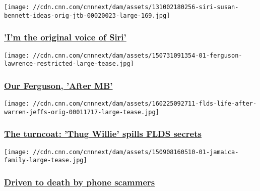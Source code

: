 \href{/2013/10/04/tech/mobile/bennett-siri-iphone-voice/index.html}{}

\texttt{[image: //cdn.cnn.com/cnnnext/dam/assets/131002180256-siri-susan-bennett-ideas-orig-jtb-00020023-large-169.jpg]}

\hypertarget{im-the-original-voice-of-siri}{%
\subsubsection{\texorpdfstring{\href{/2013/10/04/tech/mobile/bennett-siri-iphone-voice/index.html}{'I'm
the original voice of
Siri'}}{'I'm the original voice of Siri'}}\label{im-the-original-voice-of-siri}}

\href{http://www.cnn.com/interactive/2015/08/us/ferguson-anniversary/}{}

\texttt{[image: //cdn.cnn.com/cnnnext/dam/assets/150731091354-01-ferguson-lawrence-restricted-large-tease.jpg]}

\hypertarget{our-ferguson-after-mb}{%
\subsubsection{\texorpdfstring{\href{http://www.cnn.com/interactive/2015/08/us/ferguson-anniversary/}{Our
Ferguson, 'After
MB'}}{Our Ferguson, 'After MB'}}\label{our-ferguson-after-mb}}

\href{/2016/02/25/us/jessop-flds-warren-jeffs-short-creek/index.html}{}

\texttt{[image: //cdn.cnn.com/cnnnext/dam/assets/160225092711-flds-life-after-warren-jeffs-orig-00011717-large-tease.jpg]}

\hypertarget{the-turncoat-thug-willie-spills-flds-secrets}{%
\subsubsection{\texorpdfstring{\href{/2016/02/25/us/jessop-flds-warren-jeffs-short-creek/index.html}{The
turncoat: 'Thug Willie' spills FLDS
secrets}}{The turncoat: 'Thug Willie' spills FLDS secrets}}\label{the-turncoat-thug-willie-spills-flds-secrets}}

\href{/2015/10/07/us/jamaica-lottery-scam-suicide/index.html}{}

\texttt{[image: //cdn.cnn.com/cnnnext/dam/assets/150908160510-01-jamaica-family-large-tease.jpg]}

\hypertarget{driven-to-death-by-phone-scammers}{%
\subsubsection{\texorpdfstring{\href{/2015/10/07/us/jamaica-lottery-scam-suicide/index.html}{Driven
to death by phone
scammers}}{Driven to death by phone scammers}}\label{driven-to-death-by-phone-scammers}}

